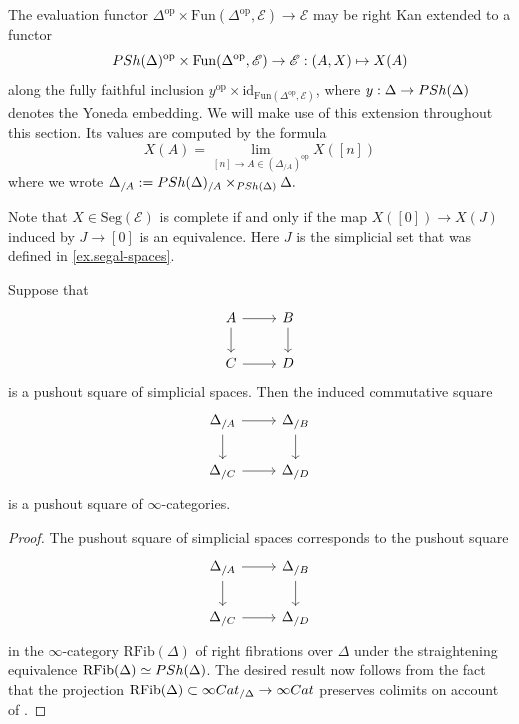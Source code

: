 \documentclass[a4paper, 11pt]{amsart}
\numberwithin{theorem}{section}
\theoremstyle{definition}
\newcommand{\cat}[1]{\textup{#1}}
\newcommand{\op}{\mathrm{op}}
\newcommand{\fun}{\mathrm{Fun}}
\newcommand{\Cat}{\cat{Cat}}
\newcommand{\E}{\mathscr{E}}
\newcommand{\Seg}{\mathrm{Seg}}
\newcommand{\RFib}{\mathrm{RFib}}
\newcommand{\PSh}{\cat{PSh}}
\newcommand{\id}{\mathrm{id}}
\begin{document}
\begin{construction} 
	The evaluation functor
	$
	\Delta^\op \times \fun(\Delta^\op, \E) \rightarrow \E 
	$
	may be right Kan extended to a functor
	$$
	\PSh(\Delta)^\op \times \fun(\Delta^\op, \E) \rightarrow \E : (A, X) \mapsto X(A)
	$$
	along the fully faithful inclusion $y^\op \times \id_{\fun(\Delta^\op, \E)}$, where 
	$y : \Delta \rightarrow \PSh(\Delta)$ denotes the Yoneda embedding. We will make use of this extension throughout this section. Its values are computed by the formula
	$$
	X(A) = \lim_{[n] \rightarrow A \in (\Delta_{/A})^\op} X([n])
	$$
	where we wrote $\Delta_{/A} := \PSh(\Delta)_{/A} \times_{\PSh(\Delta)} \Delta.$
\end{construction}


\begin{remark}
	Note that $X \in \Seg(\E)$ is complete if and only if the map 
	$
	X([0]) \rightarrow X(J)
	$
	induced by $J\rightarrow [0]$ is an equivalence. Here $J$ is the simplicial set that was defined in \cref{ex.segal-spaces}.
\end{remark}

\begin{lemma}\label{lem.int-ccat-slices}
	Suppose that 
	\[
	\begin{tikzcd}
		A \arrow[r,""]\arrow[d,""'] & B \arrow[d,""] \\
		C \arrow[r,""] & D
	\end{tikzcd}
	\]
	is a pushout square of simplicial spaces. Then 
	the induced commutative square
	\[
	\begin{tikzcd}
		\Delta_{/A} \arrow[r]\arrow[d] & \Delta_{/B} \arrow[d] \\
		\Delta_{/C} \arrow[r] & \Delta_{/D}
	\end{tikzcd}
	\]
	is a pushout square of $\infty$-categories. 
\end{lemma}
\begin{proof}
	The pushout square of simplicial spaces corresponds to the pushout square 
	\[
	\begin{tikzcd}
		\Delta_{/A} \arrow[r]\arrow[d] & \Delta_{/B} \arrow[d] \\
		\Delta_{/C} \arrow[r] & \Delta_{/D}
	\end{tikzcd}
	\]
	in the $\infty$-category $\RFib(\Delta)$ of right fibrations over $\Delta$ under the straightening equivalence 
	$\RFib(\Delta) \simeq \PSh(\Delta)$. The desired result now follows from the fact that the projection 
	$
	\RFib(\Delta) \subset \infty\Cat_{/\Delta} \rightarrow \infty\Cat 
	$
	preserves colimits on account of \cite[Corollary 7.6]{GepnerHaugsengNikolaus}.
\end{proof}
\end{document}
